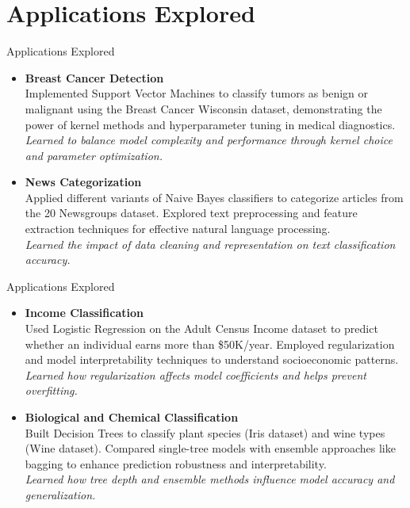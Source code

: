 \documentclass{beamer}
\begin{document}
\section{Applications Explored}

\begin{frame}{Applications Explored}

    \begin{itemize}
      \item \textbf{Breast Cancer Detection} \\
      Implemented Support Vector Machines to classify tumors as benign or malignant using the Breast Cancer Wisconsin dataset, demonstrating the power of kernel methods and hyperparameter tuning in medical diagnostics. \\
      \textit{Learned to balance model complexity and performance through kernel choice and parameter optimization.}
    
      \item \textbf{News Categorization} \\
      Applied different variants of Naive Bayes classifiers to categorize articles from the 20 Newsgroups dataset. Explored text preprocessing and feature extraction techniques for effective natural language processing. \\
      \textit{Learned the impact of data cleaning and representation on text classification accuracy.}
      \end{itemize}
\end{frame}
\begin{frame}{Applications Explored}
    \begin{itemize}
      \item \textbf{Income Classification} \\
      Used Logistic Regression on the Adult Census Income dataset to predict whether an individual earns more than \$50K/year. Employed regularization and model interpretability techniques to understand socioeconomic patterns. \\
      \textit{Learned how regularization affects model coefficients and helps prevent overfitting.}
    
      \item \textbf{Biological and Chemical Classification} \\
      Built Decision Trees to classify plant species (Iris dataset) and wine types (Wine dataset). Compared single-tree models with ensemble approaches like bagging to enhance prediction robustness and interpretability. \\
      \textit{Learned how tree depth and ensemble methods influence model accuracy and generalization.}
    \end{itemize}
    
\end{frame}
    
\end{document}
